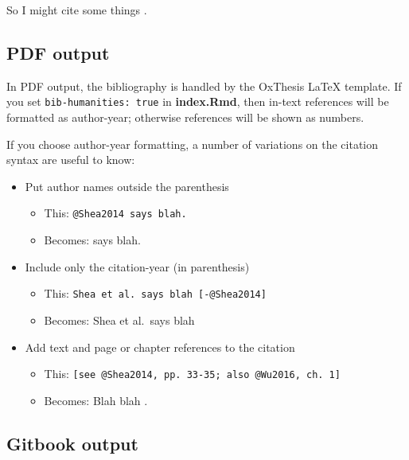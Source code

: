 \documentclass[a4paper, twoside]{templates/ociamthesis}
\providecommand{\tightlist}{%
  \setlength{\itemsep}{0pt}\setlength{\parskip}{0pt}}
\theoremstyle{definition}
\theoremstyle{definition}
\theoremstyle{definition}
\theoremstyle{definition}
\theoremstyle{remark}
\begin{document}
So I might cite some things \autocite{Shea2014,Lottridge2012}.

\hypertarget{pdf-output}{%
\subsection{PDF output}\label{pdf-output}}

In PDF output, the bibliography is handled by the OxThesis LaTeX template.
If you set \texttt{bib-humanities:\ true} in \textbf{index.Rmd}, then in-text references will be formatted as author-year; otherwise references will be shown as numbers.

If you choose author-year formatting, a number of variations on the citation syntax are useful to know:

\begin{itemize}
\tightlist
\item
  Put author names outside the parenthesis

  \begin{itemize}
  \tightlist
  \item
    This: \texttt{@Shea2014\ says\ blah.}
  \item
    Becomes: \textcite{Shea2014} says blah.
  \end{itemize}
\item
  Include only the citation-year (in parenthesis)

  \begin{itemize}
  \tightlist
  \item
    This: \texttt{Shea\ et\ al.\ says\ blah\ {[}-@Shea2014{]}}
  \item
    Becomes: Shea et al.~says blah \autocite*{Shea2014}
  \end{itemize}
\item
  Add text and page or chapter references to the citation

  \begin{itemize}
  \tightlist
  \item
    This: \texttt{{[}see\ @Shea2014,\ pp.\ 33-35;\ also\ @Wu2016,\ ch.\ 1{]}}
  \item
    Becomes: Blah blah \autocites[see][pp.~33-35]{Shea2014}[also][ch.~1]{Wu2016}.
  \end{itemize}
\end{itemize}

\hypertarget{gitbook-output}{%
\subsection{Gitbook output}\label{gitbook-output}}
\end{document}
